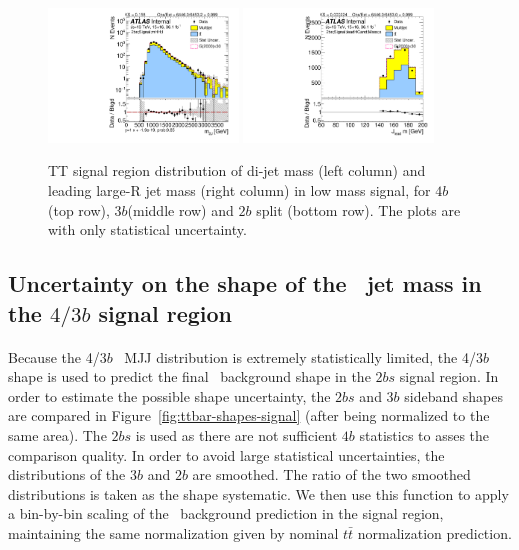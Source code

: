 \begin{figure}[htbp!]
\begin{center}
\includegraphics[width=0.45\textwidth,angle=-90]{figures/boosted/TT/Moriond_TT_TwoTag_split_Signal_mHH_l_1.pdf}
\includegraphics[width=0.45\textwidth,angle=-90]{figures/boosted/TT/Moriond_TT_TwoTag_split_Signal_leadHCand_Mass_s.pdf}\\
\end{center}
\caption{TT signal region distribution of di-jet mass (left column) and leading large-R jet mass (right column) in low mass signal, for $4b$ (top row), $3b$(middle row) and $2b$ split (bottom row). The plots are with only statistical uncertainty.}
\label{CRSB:TTSR_Distribution}
\end{figure}


\clearpage
\subsection{Uncertainty on the shape of the \ttbar\ jet mass in the $4/3b$ signal region}
\label{sec:unc-shape-ttbar-in-sr}

\paragraph{}
Because the 4/$3b$ \ttbar\ MJJ distribution is extremely statistically limited, the 4/$3b$ shape is used to predict the final \ttbar\ background shape in the $2bs$ signal region. In order to estimate the possible shape uncertainty, the $2bs$ and $3b$ sideband shapes are compared in Figure~\ref{fig:ttbar-shapes-signal} (after being normalized to the same area).  The $2bs$ is used as there are not sufficient $4b$ statistics to asses the comparison quality. In order to avoid large statistical uncertainties, the distributions of the $3b$ and $2b$ are smoothed. The ratio of the two smoothed distributions is taken as the shape systematic. We then use this function to apply a bin-by-bin scaling of the \ttbar\ background prediction in the signal region, maintaining the same normalization given by nominal $t\bar{t}$ normalization prediction.

